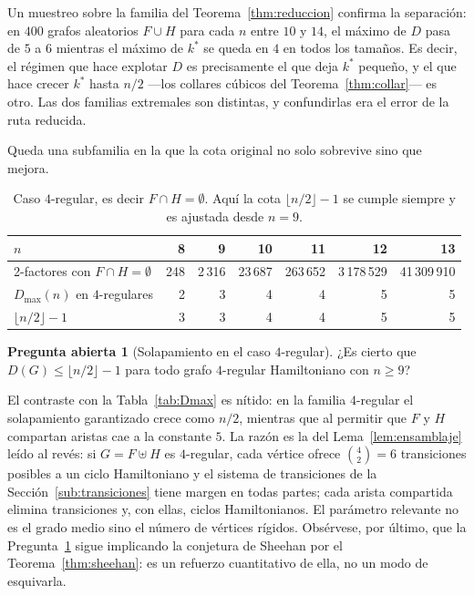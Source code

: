 \documentclass[11pt,a4paper]{article}
\theoremstyle{definition}
\newtheorem{pregunta}[teorema]{Pregunta abierta}
\theoremstyle{remark}
\begin{document}
Un muestreo sobre la familia del Teorema~\ref{thm:reduccion} confirma la separación: en $400$ grafos aleatorios $F\cup H$ para cada $n$ entre $10$ y $14$, el máximo de $D$ pasa de $5$ a $6$ mientras el máximo de $k^*$ se queda en $4$ en todos los tamaños. Es decir, el régimen que hace explotar $D$ es precisamente el que deja $k^*$ pequeño, y el que hace crecer $k^*$ hasta $n/2$ —los collares cúbicos del Teorema~\ref{thm:collar}— es otro. Las dos familias extremales son distintas, y confundirlas era el error de la ruta reducida.

Queda una subfamilia en la que la cota original no solo sobrevive sino que mejora.

\begin{table}[h]
\centering
\begin{tabular}{lrrrrrr}
\toprule
$n$ & 8 & 9 & 10 & 11 & 12 & 13\\
\midrule
2-factores con $F\cap H=\emptyset$ & 248 & 2\,316 & 23\,687 & 263\,652 & 3\,178\,529 & 41\,309\,910\\
$D_{\max}(n)$ en $4$-regulares & 2 & 3 & 4 & 4 & 5 & 5\\
$\lfloor n/2\rfloor-1$ & 3 & 3 & 4 & 4 & 5 & 5\\
\bottomrule
\end{tabular}
\caption{Caso $4$-regular, es decir $F\cap H=\emptyset$. Aquí la cota $\lfloor n/2\rfloor-1$ se cumple siempre y es ajustada desde $n=9$.}\label{tab:reg4nuevo}
\end{table}

\begin{pregunta}[Solapamiento en el caso $4$-regular]\label{conj:reg4}
¿Es cierto que $D(G)\le\lfloor n/2\rfloor-1$ para todo grafo $4$-regular Hamiltoniano con $n\ge9$?
\end{pregunta}

El contraste con la Tabla~\ref{tab:Dmax} es nítido: en la familia $4$-regular el solapamiento garantizado crece como $n/2$, mientras que al permitir que $F$ y $H$ compartan aristas cae a la constante $5$. La razón es la del Lema~\ref{lem:ensamblaje} leído al revés: si $G=F\uplus H$ es $4$-regular, cada vértice ofrece $\binom{4}{2}=6$ transiciones posibles a un ciclo Hamiltoniano y el sistema de transiciones de la Sección~\ref{sub:transiciones} tiene margen en todas partes; cada arista compartida elimina transiciones y, con ellas, ciclos Hamiltonianos. El parámetro relevante no es el grado medio sino el número de vértices rígidos. Obsérvese, por último, que la Pregunta~\ref{conj:reg4} sigue implicando la conjetura de Sheehan por el Teorema~\ref{thm:sheehan}: es un refuerzo cuantitativo de ella, no un modo de esquivarla.
\end{document}

